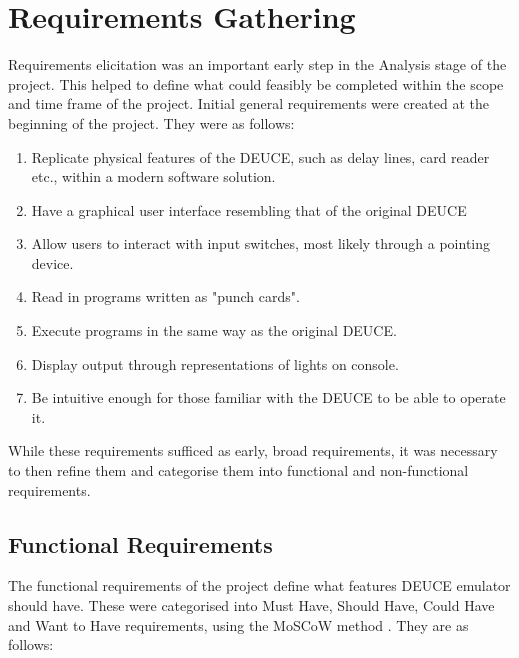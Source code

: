 \documentclass{l4proj}
\begin{document}
\section{Requirements Gathering}
Requirements elicitation was an important early step in the Analysis stage of the project. This helped to define what could feasibly be completed within the scope and time frame of the project. Initial general requirements were created at the beginning of the project. They were as follows:
\begin{enumerate}
	\item Replicate physical features of the DEUCE, such as delay lines, card reader etc., within a modern software solution.
	\item Have a graphical user interface resembling that of the original DEUCE
	\item Allow users to interact with input switches, most likely through a pointing device.
	\item Read in programs written as "punch cards".
	\item Execute programs in the same way as the original DEUCE.
	\item Display output through representations of lights on console.
	\item Be intuitive enough for those familiar with the DEUCE to be able to operate it.	
\end{enumerate}

While these requirements sufficed as early, broad requirements, it was necessary to then refine them and categorise them into functional and non-functional requirements.

\subsection{Functional Requirements}
The functional requirements of the project define what features DEUCE emulator should have. These were categorised into Must Have, Should Have, Could Have and Want to Have requirements, using the MoSCoW method \citep{Moscow14}. They are as follows:
\\
\end{document}
